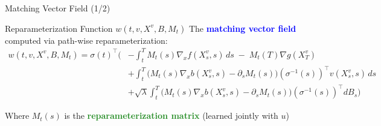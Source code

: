 \documentclass[aspectratio=169,xcolor=dvipsnames]{beamer}
\begin{document}
\begin{frame}{Matching Vector Field (1/2)}
    \vspace{-0.3cm}
    
    \begin{block}{Reparameterization Function $w(t, v, X^v, B, M_t)$}
        \small
        The \textcolor{blue}{\textbf{matching vector field}} computed via path-wise reparameterization:
        \vspace{-0.2cm}
        \begin{equation}
        \begin{aligned}
        w(t, v, X^v, B, M_t) 
        = \sigma(t)^\top \Bigg(
        &- \int_t^T M_t(s) \nabla_x f(X_s^v, s)\, ds 
           \;-\; M_t(T)\nabla g(X_T^v) \\[4pt]
        &+ \int_t^T \big(M_t(s)\nabla_x b(X_s^v, s) - \partial_s M_t(s)\big)(\sigma^{-1}(s))^\top v(X_s^v, s)\, ds \\[4pt]
        &+ \sqrt{\lambda} \int_t^T \big(M_t(s)\nabla_x b(X_s^v, s) - \partial_s M_t(s)\big)(\sigma^{-1}(s))^\top dB_s
        \Bigg)
        \end{aligned}
        \end{equation}
        
        Where $M_t(s)$ is the \textcolor{ForestGreen}{\textbf{reparameterization matrix}} (learned jointly with $u$)
    \end{block}

\end{frame}
\end{document}

